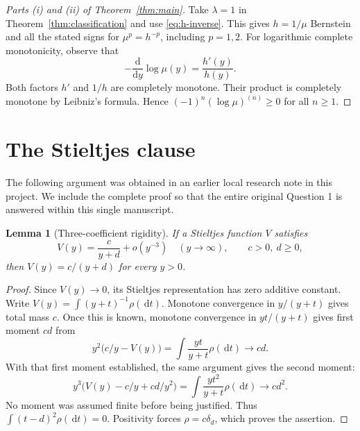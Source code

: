 \documentclass[11pt,a4paper]{article}
\newtheorem{lemma}[theorem]{Lemma}
\theoremstyle{definition}\newtheorem{definition}[theorem]{Definition}
\theoremstyle{remark}\newtheorem{remark}[theorem]{Remark}
\newcommand{\dd}{\,\mathrm d}
\begin{document}
\begin{proof}[Parts (i) and (ii) of Theorem~\ref{thm:main}]
Take $\lambda=1$ in Theorem~\ref{thm:classification} and use
\eqref{eq:h-inverse}. This gives $h=1/\mu$ Bernstein and all
the stated signs for $\mu^p=h^{-p}$, including $p=1,2$.
For logarithmic complete monotonicity, observe that
\[
 -\frac{\mathrm d}{\mathrm dy}\log\mu(y)
 =\frac{h'(y)}{h(y)}.
\]
Both factors $h'$ and $1/h$ are completely monotone. Their product
is completely monotone by Leibniz's formula. Hence
$(-1)^n(\log\mu)^{(n)}\ge0$ for all $n\ge1$.
\end{proof}

\section{The Stieltjes clause}

The following argument was obtained in an earlier local research
note in this project. We include the complete proof so that the
entire original Question 1 is answered within this single manuscript.

\begin{lemma}[Three-coefficient rigidity]\label{lem:rigidity}
If a Stieltjes function $V$ satisfies
\[
 V(y)=\frac c{y+d}+o(y^{-3})\quad(y\to\infty),
 \qquad c>0,\ d\ge0,
\]
then $V(y)=c/(y+d)$ for every $y>0$.
\end{lemma}

\begin{proof}
Since $V(y)\to0$, its Stieltjes representation has zero additive
constant. Write $V(y)=\int(y+t)^{-1}\rho(\dd t)$. Monotone
convergence in $y/(y+t)$ gives total mass $c$. Once this is known,
monotone convergence in $yt/(y+t)$ gives first moment $cd$ from
\[
 y^2\bigl(c/y-V(y)\bigr)
 =\int\frac{yt}{y+t}\rho(\dd t)\longrightarrow cd.
\]
With that first moment established, the same argument gives the
second moment:
\[
 y^3\bigl(V(y)-c/y+cd/y^2\bigr)
 =\int\frac{yt^2}{y+t}\rho(\dd t)\longrightarrow cd^2.
\]
No moment was assumed finite before being justified. Thus
$\int(t-d)^2\rho(\dd t)=0$. Positivity forces
$\rho=c\delta_d$, which proves the assertion.
\end{proof}
\end{document}
